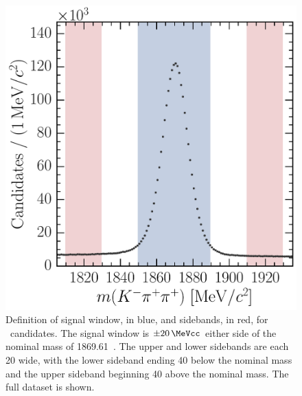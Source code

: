 \begin{figure}
  \centering
  \includegraphics[width=\textwidth]{figures/production/fitting/DpToKpipi_mass_offline_selection_regions}
  \caption{%
    Definition of signal window, in blue, and sidebands, in red, for 
    \DpToKpipi\ candidates.
    The signal window is $\pm\SI{20}{\MeVcc}$ either side of the nominal 
    \PDplus mass of \SI{1869.61}{\MeVcc}~\cite{PDG2014}.
    The upper and lower sidebands are each \SI{20}{\MeVcc} wide, with the lower 
    sideband ending \SI{40}{\MeVcc} below the nominal \PDplus mass and the 
    upper sideband beginning \SI{40}{\MeVcc} above the nominal \PDplus mass.
    The full dataset is shown.
  }
  \label{fig:prod:fitting:regions:DpToKpipi}
\end{figure}

